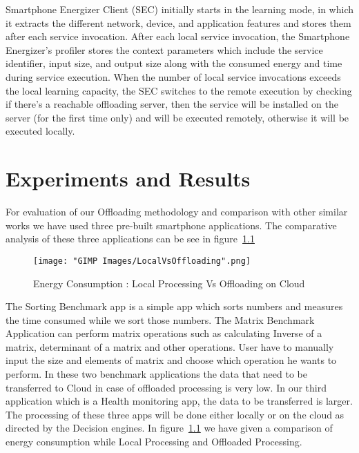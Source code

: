 \documentclass[12pt]{report}
\begin{document}
Smartphone Energizer Client (SEC) initially starts in the learning mode, in which it extracts the different network, device, and application features and stores them after each service invocation. After each local service invocation, the
Smartphone Energizer’s profiler stores the context parameters which include the service identifier, input size, and output size along with the consumed energy and time during service execution. When the number of local service invocations exceeds the local
learning capacity, the SEC switches to the remote execution by checking if there's a reachable offloading server, then the service will be installed on the server (for the first time only) and will be executed remotely, otherwise it will be executed locally.
\chapter{Experiments and Results} %

For evaluation of our Offloading methodology and comparison with other similar works we have used three pre-built smartphone applications. The comparative analysis of these three applications can be see in figure~\ref{fig:LocalVsOffloading}


\begin{figure}[h!]
  \centering
  \texttt{[image: "GIMP Images/LocalVsOffloading".png]}
  \caption{Energy Consumption : Local Processing Vs Offloading on Cloud}
  \label{fig:LocalVsOffloading}
\end{figure}

The Sorting Benchmark app is a simple app which sorts numbers and measures the time consumed while we sort those numbers. The Matrix Benchmark Application can perform matrix operations such as calculating Inverse of a matrix, determinant of a matrix and other operations. User have to manually input the size and elements of matrix and choose which operation he wants to perform. In these two benchmark applications the data that need to be transferred to Cloud in case of offloaded processing is very low. In our third application which is a Health monitoring app, the data to be transferred is larger. The processing of these three apps will be done either locally or on the cloud as directed by the Decision engines. In figure~\ref{fig:LocalVsOffloading} we have given a comparison of energy consumption while Local Processing and Offloaded Processing.
\end{document}
